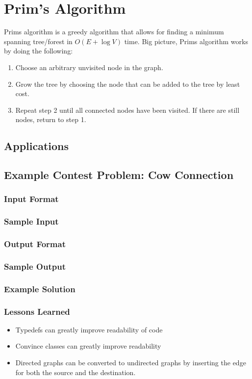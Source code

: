 \section{Prim's Algorithm}
Prims algorithm is a greedy algorithm that allows for finding a minimum spanning tree/forest in $O(E + \log{V})$ time.
Big picture, Prims algorithm works by doing the following:

\begin{enumerate}
	\item Choose an arbitrary unvisited node in the graph.
	\item Grow the tree by choosing the node that can be added to the tree by least cost.
	\item Repeat step 2 until all connected nodes have been visited.  If there are still nodes, return to step 1.
\end{enumerate}


\subsection{Applications}
\subsection{Example Contest Problem: Cow Connection}
\subsubsection{Input Format}
\subsubsection{Sample Input}
\subsubsection{Output Format}
\subsubsection{Sample Output}
\subsubsection{Example Solution}
\subsubsection{Lessons Learned}
\begin{itemize}
	\item Typedefs can greatly improve readability of code
	\item Convince classes can greatly improve readability
	\item Directed graphs can be converted to undirected graphs by inserting the edge for both the source and the destination.
\end{itemize}
